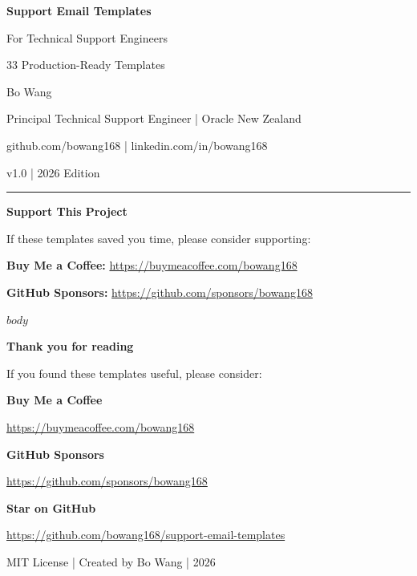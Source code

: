 \documentclass[11pt,a4paper,openany]{report}
\begin{document}
\thispagestyle{empty}
\begin{center}
\vspace*{3cm}
{\Huge\bfseries\color{chaptercolor} Support Email Templates}

\vspace{1cm}
{\Large For Technical Support Engineers}

\vspace{0.5cm}
{\large 33 Production-Ready Templates}

\vspace{2.5cm}
{\Large Bo Wang}

\vspace{0.3cm}
{\normalsize Principal Technical Support Engineer | Oracle New Zealand}

\vspace{0.2cm}
{\small github.com/bowang168 | linkedin.com/in/bowang168}

\vspace{2cm}
{\large v1.0 | 2026 Edition}

\vspace{1.5cm}
\hrule
\vspace{0.5cm}
{\normalsize\textbf{Support This Project}}

\vspace{0.3cm}
{\small If these templates saved you time, please consider supporting:}

\vspace{0.2cm}
{\small \textcolor{linkcolor}{\textbf{Buy Me a Coffee:}} \url{https://buymeacoffee.com/bowang168}}

\vspace{0.1cm}
{\small \textcolor{linkcolor}{\textbf{GitHub Sponsors:}} \url{https://github.com/sponsors/bowang168}}
\end{center}
\cleardoublepage

\thispagestyle{empty}
\tableofcontents
\cleardoublepage

$body$

\cleardoublepage
\thispagestyle{empty}
\begin{center}
\vspace*{6cm}
{\Large\bfseries Thank you for reading}

\vspace{1cm}
{\normalsize If you found these templates useful, please consider:}

\vspace{1cm}
{\large \textcolor{linkcolor}{\textbf{Buy Me a Coffee}}}

{\normalsize \url{https://buymeacoffee.com/bowang168}}

\vspace{0.8cm}
{\large \textcolor{linkcolor}{\textbf{GitHub Sponsors}}}

{\normalsize \url{https://github.com/sponsors/bowang168}}

\vspace{0.8cm}
{\large \textcolor{linkcolor}{\textbf{Star on GitHub}}}

{\normalsize \url{https://github.com/bowang168/support-email-templates}}

\vspace{2cm}
{\small MIT License | Created by Bo Wang | 2026}
\end{center}
\end{document}
